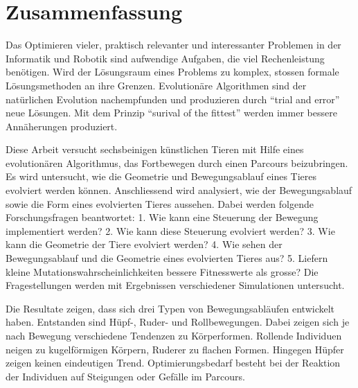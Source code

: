 %
%


\chapter{Zusammenfassung}

  Das Optimieren vieler, praktisch relevanter und interessanter Problemen
  in der Informatik und Robotik sind aufwendige Aufgaben, die viel Rechenleistung benötigen.
  Wird der Lösungsraum eines Problems zu komplex, stossen formale Lösungsmethoden an ihre Grenzen.
  Evolutionäre Algorithmen sind der natürlichen Evolution nachempfunden und
  produzieren durch ``trial and error'' neue Lösungen.
  Mit dem Prinzip ``surival of the fittest'' werden immer bessere Annäherungen produziert.

  \smallskip

  Diese Arbeit versucht sechsbeinigen künstlichen Tieren mit Hilfe eines evolutionären Algorithmus,
  das Fortbewegen durch einen Parcours beizubringen.
  Es wird untersucht, wie die Geometrie und Bewegungsablauf eines Tieres evolviert werden können.
  Anschliessend wird analysiert, wie der Bewegungsablauf sowie die Form eines evolvierten Tieres aussehen.
  Dabei werden folgende Forschungsfragen beantwortet:
  1. Wie kann eine Steuerung der Bewegung implementiert werden?
  2. Wie kann diese Steuerung evolviert werden?
  3. Wie kann die Geometrie der Tiere evolviert werden?
  4. Wie sehen der Bewegungsablauf und die Geometrie eines evolvierten Tieres aus?
  5. Liefern kleine Mutationswahrscheinlichkeiten bessere Fitnesswerte als grosse?
  Die Fragestellungen werden mit Ergebnissen verschiedener Simulationen untersucht.

  \smallskip

  Die Resultate zeigen, dass sich drei Typen von Bewegungsabläufen entwickelt haben.
  Entstanden sind Hüpf-, Ruder- und Rollbewegungen.
  Dabei zeigen sich je nach Bewegung verschiedene Tendenzen zu Körperformen.
  Rollende Individuen neigen zu kugelförmigen Körpern, Ruderer zu flachen Formen.
  Hingegen Hüpfer zeigen keinen eindeutigen Trend.
  Optimierungsbedarf besteht bei der Reaktion der Individuen auf Steigungen oder Gefälle im Parcours.

